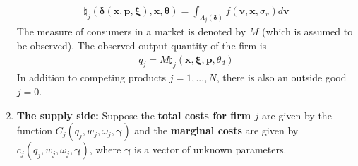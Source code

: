 \documentclass[11pt]{elegantbook}
\begin{document}
\begin{enumerate}
\begin{equation}
        \begin{aligned}
            \natural_j(\boldsymbol{\delta}(\boldsymbol{x},\boldsymbol{p},\boldsymbol{\xi}),\boldsymbol{x},\boldsymbol{\theta})=\int_{A_j(\boldsymbol{\delta})}f(\boldsymbol{v},\boldsymbol{x},\sigma_v)d \boldsymbol{v}
        \end{aligned}
        \nonumber
    \end{equation}
    The measure of consumers in a market is denoted by $M$ (which is assumed to be observed). The observed output quantity of the firm is
    \begin{equation}
        \begin{aligned}
            q_j=M \natural_j(\boldsymbol{x},\boldsymbol{\xi},\boldsymbol{p},\theta_d)
        \end{aligned}
        \nonumber
    \end{equation}
    In addition to competing products $j=1,...,N$, there is also an outside good $j=0$.
    \item \textbf{The supply side:}
    \subitem Suppose the \textbf{total costs for firm $j$} are given by the function $C_j(q_j,w_j,\omega_j,\boldsymbol{\gamma})$ and the \textbf{marginal costs} are given by $c_j(q_j,w_j,\omega_j,\boldsymbol{\gamma})$, where $\boldsymbol{\gamma}$ is a vector of unknown parameters.
\end{enumerate}
\end{document}
